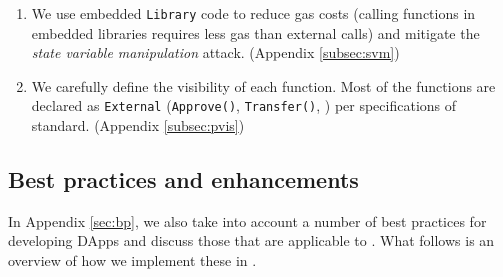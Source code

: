 \begin{enumerate}[noitemsep,topsep=0pt]
	\item We use embedded \texttt{Library} code to reduce gas costs (calling functions in embedded libraries requires less gas than external calls) and mitigate the \textit{state variable manipulation} attack. (\cf Appendix \ref{subsec:svm})
	
	\item We carefully define the visibility of each function. Most of the functions are declared as \texttt{External} (\eg \texttt{Approve()}, \texttt{Transfer()}, \etc) per specifications of \erc standard. (\cf Appendix \ref{subsec:pvis})
\end{enumerate}

\subsection{Best practices and enhancements}

In Appendix \ref{sec:bp}, we also take into account a number of best practices for developing DApps and discuss those that are applicable to \erc. What follows is an overview of how we implement these in \sys. 

